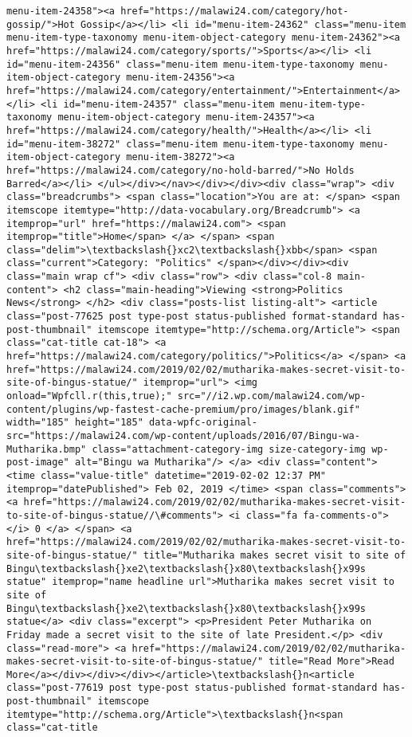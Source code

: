 \documentclass[11pt]{article}
\begin{document}
\begin{Verbatim}[commandchars=\\\{\}]
menu-item-24358"><a href="https://malawi24.com/category/hot-gossip/">Hot Gossip</a></li> <li id="menu-item-24362" class="menu-item menu-item-type-taxonomy menu-item-object-category menu-item-24362"><a href="https://malawi24.com/category/sports/">Sports</a></li> <li id="menu-item-24356" class="menu-item menu-item-type-taxonomy menu-item-object-category menu-item-24356"><a href="https://malawi24.com/category/entertainment/">Entertainment</a></li> <li id="menu-item-24357" class="menu-item menu-item-type-taxonomy menu-item-object-category menu-item-24357"><a href="https://malawi24.com/category/health/">Health</a></li> <li id="menu-item-38272" class="menu-item menu-item-type-taxonomy menu-item-object-category menu-item-38272"><a href="https://malawi24.com/category/no-hold-barred/">No Holds Barred</a></li> </ul></div></nav></div></div><div class="wrap"> <div class="breadcrumbs"> <span class="location">You are at: </span> <span itemscope itemtype="http://data-vocabulary.org/Breadcrumb"> <a itemprop="url" href="https://malawi24.com"> <span itemprop="title">Home</span> </a> </span> <span class="delim">\textbackslash{}xc2\textbackslash{}xbb</span> <span class="current">Category: "Politics" </span></div></div><div class="main wrap cf"> <div class="row"> <div class="col-8 main-content"> <h2 class="main-heading">Viewing <strong>Politics News</strong> </h2> <div class="posts-list listing-alt"> <article class="post-77625 post type-post status-published format-standard has-post-thumbnail" itemscope itemtype="http://schema.org/Article"> <span class="cat-title cat-18"> <a href="https://malawi24.com/category/politics/">Politics</a> </span> <a href="https://malawi24.com/2019/02/02/mutharika-makes-secret-visit-to-site-of-bingus-statue/" itemprop="url"> <img onload="Wpfcll.r(this,true);" src="//i2.wp.com/malawi24.com/wp-content/plugins/wp-fastest-cache-premium/pro/images/blank.gif" width="185" height="185" data-wpfc-original-src="https://malawi24.com/wp-content/uploads/2016/07/Bingu-wa-Mutharika.bmp" class="attachment-category-img size-category-img wp-post-image" alt="Bingu wa Mutharika"/> </a> <div class="content"> <time class="value-title" datetime="2019-02-02 12:37 PM" itemprop="datePublished"> Feb 02, 2019 </time> <span class="comments"> <a href="https://malawi24.com/2019/02/02/mutharika-makes-secret-visit-to-site-of-bingus-statue//\#comments"> <i class="fa fa-comments-o"></i> 0 </a> </span> <a href="https://malawi24.com/2019/02/02/mutharika-makes-secret-visit-to-site-of-bingus-statue/" title="Mutharika makes secret visit to site of Bingu\textbackslash{}xe2\textbackslash{}x80\textbackslash{}x99s statue" itemprop="name headline url">Mutharika makes secret visit to site of Bingu\textbackslash{}xe2\textbackslash{}x80\textbackslash{}x99s statue</a> <div class="excerpt"> <p>President Peter Mutharika on Friday made a secret visit to the site of late President.</p> <div class="read-more"> <a href="https://malawi24.com/2019/02/02/mutharika-makes-secret-visit-to-site-of-bingus-statue/" title="Read More">Read More</a></div></div></div></article>\textbackslash{}n<article class="post-77619 post type-post status-published format-standard has-post-thumbnail" itemscope itemtype="http://schema.org/Article">\textbackslash{}n<span class="cat-title 
\end{Verbatim}
\end{document}
